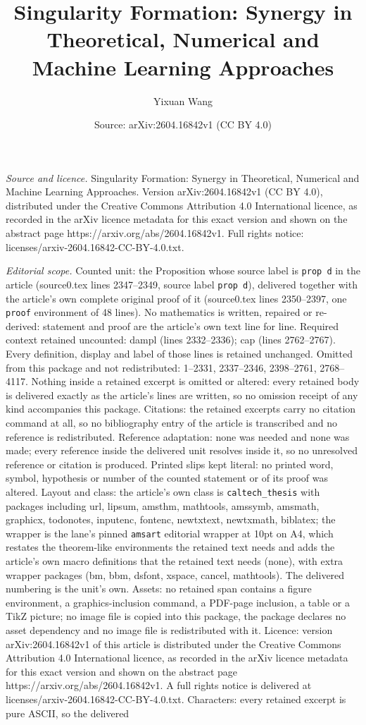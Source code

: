 \documentclass[10pt,a4paper]{amsart}
\title[Singularity Formation: Synergy in Theoretical, Numerical and]{Singularity Formation: Synergy in Theoretical, Numerical and Machine Learning Approaches}
\author{Yixuan Wang}
\date{Source: arXiv:2604.16842v1 (CC BY 4.0)}
\begin{document}
\maketitle

\noindent\emph{Source and licence.} Singularity Formation: Synergy in Theoretical, Numerical and Machine Learning Approaches. Version arXiv:2604.16842v1 (CC BY 4.0), distributed under the Creative Commons Attribution 4.0 International licence, as recorded in the arXiv licence metadata for this exact version and shown on the abstract page https://arxiv.org/abs/2604.16842v1. Full rights notice: licenses/arxiv-2604.16842-CC-BY-4.0.txt.\par\smallskip

\noindent\textit{Editorial scope.} Counted unit: the Proposition whose source label is \texttt{prop d} in the article (source0.tex lines 2347--2349, source label \texttt{prop d}), delivered together with the article's own complete original proof of it (source0.tex lines 2350--2397, one \texttt{proof} environment of 48 lines). No mathematics is written, repaired or re-derived: statement and proof are the article's own text line for line. Required context retained uncounted: dampl (lines 2332--2336); cap (lines 2762--2767). Every definition, display and label of those lines is retained unchanged. Omitted from this package and not redistributed: 1--2331, 2337--2346, 2398--2761, 2768--4117. Nothing inside a retained excerpt is omitted or altered: every retained body is delivered exactly as the article's lines are written, so no omission receipt of any kind accompanies this package. Citations: the retained excerpts carry no citation command at all, so no bibliography entry of the article is transcribed and no reference is redistributed. Reference adaptation: none was needed and none was made; every reference inside the delivered unit resolves inside it, so no unresolved reference or citation is produced. Printed slips kept literal: no printed word, symbol, hypothesis or number of the counted statement or of its proof was altered. Layout and class: the article's own class is \texttt{caltech\_thesis} with packages including url, lipsum, amsthm, mathtools, amssymb, amsmath, graphicx, todonotes, inputenc, fontenc, newtxtext, newtxmath, biblatex; the wrapper is the lane's pinned \texttt{amsart} editorial wrapper at 10pt on A4, which restates the theorem-like environments the retained text needs and adds the article's own macro definitions that the retained text needs (none), with extra wrapper packages (bm, bbm, dsfont, xspace, cancel, mathtools). The delivered numbering is the unit's own. Assets: no retained span contains a figure environment, a graphics-inclusion command, a PDF-page inclusion, a table or a TikZ picture; no image file is copied into this package, the package declares no asset dependency and no image file is redistributed with it. Licence: version arXiv:2604.16842v1 of this article is distributed under the Creative Commons Attribution 4.0 International licence, as recorded in the arXiv licence metadata for this exact version and shown on the abstract page https://arxiv.org/abs/2604.16842v1. A full rights notice is delivered at licenses/arxiv-2604.16842-CC-BY-4.0.txt. Characters: every retained excerpt is pure ASCII, so the delivered 
\end{document}
